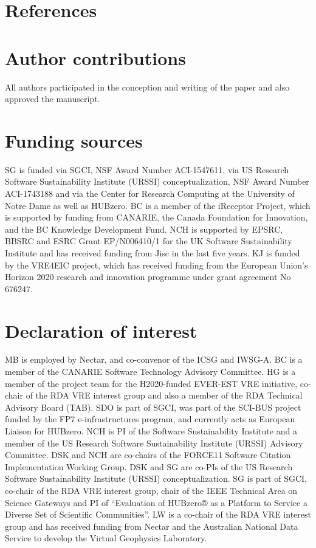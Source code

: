 \documentclass[review]{elsarticle}
\begin{document}
\section*{References}



\section*{Author contributions}
All authors participated in the conception and writing of the paper and also approved the manuscript.

\section*{Funding sources} 
SG is funded via SGCI, NSF Award Number ACI-1547611, via US Research Software Sustainability Institute (URSSI) conceptualization, NSF Award Number ACI-1743188 and via the Center for Research Computing at the University of Notre Dame as well as HUBzero.
BC is a member of the iReceptor Project, which is supported by funding from CANARIE, the Canada Foundation for Innovation, and the BC Knowledge Development Fund.
NCH is supported by EPSRC, BBSRC and ESRC Grant EP/N006410/1 for the UK Software Sustainability Institute and has received funding from Jisc in the last five years.
KJ is funded by the VRE4EIC project, which has received funding from the European Union’s Horizon 2020 research and innovation programme under grant agreement No 676247.


\section*{Declaration of interest}
MB is employed by Nectar, and co-convenor of the ICSG and IWSG-A.
BC is a member of the CANARIE Software Technology Advisory Committee.
HG is a member of the project team for the H2020-funded EVER-EST VRE initiative, co-chair of the RDA VRE interest group and also a member of the RDA Technical Advisory Board (TAB).
SDO is part of SGCI, was part of the SCI-BUS project funded by the FP7 e-infrastructures program, and currently acts as European Liaison for HUBzero.
NCH is PI of the Software Sustainability Institute and a member of the US Research Software Sustainability Institute (URSSI) Advisory Committee.
DSK and NCH are co-chairs of the FORCE11 Software Citation Implementation Working Group.
DSK and SG are co-PIs of the US Research Software Sustainability Institute (URSSI) conceptualization.
SG is part of SGCI, co-chair of the RDA VRE interest group, chair of the IEEE Technical Area on Science Gateways and PI of “Evaluation of HUBzero® as a Platform to Service a Diverse Set of Scientific Communities”.
LW is a co-chair of the RDA VRE interest group and has received funding from Nectar and the Australian National Data Service to develop the Virtual Geophysics Laboratory.
\end{document}
